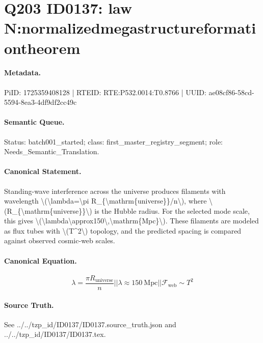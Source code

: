 \section*{Q203 ID0137: law N:normalizedmegastructureformationtheorem}
\paragraph{Metadata.}
PiID: 1725359408128 | RTEID: RTE:P532.0014:T0.8766 | UUID: ae08cf86-58cd-5594-8ea3-4df9df2cc49c

\paragraph{Semantic Queue.}
Status: batch001\_started; class: first\_master\_registry\_segment; role: Needs\_Semantic\_Translation.

\paragraph{Canonical Statement.}
Standing-wave interference across the universe produces filaments with wavelength \textbackslash{}(\textbackslash{}lambda=\textbackslash{}pi R\_\{\textbackslash{}mathrm\{universe\}\}/n\textbackslash{}), where \textbackslash{}(R\_\{\textbackslash{}mathrm\{universe\}\}\textbackslash{}) is the Hubble radius. For the selected mode scale, this gives \textbackslash{}(\textbackslash{}lambda\textbackslash{}approx150\textbackslash{},\textbackslash{}mathrm\{Mpc\}\textbackslash{}). These filaments are modeled as flux tubes with \textbackslash{}(T\textasciicircum{}2\textbackslash{}) topology, and the predicted spacing is compared against observed cosmic-web scales.

\paragraph{Canonical Equation.}
\[
\lambda=\frac{\pi R_{\mathrm{universe}}}{n} || \lambda \approx 150\ \mathrm{Mpc} || \mathcal{F}_{\mathrm{web}}\sim T^2
\]

\paragraph{Source Truth.}
See ../../tzp\_id/ID0137/ID0137.source\_truth.json and ../../tzp\_id/ID0137/ID0137.tex.
